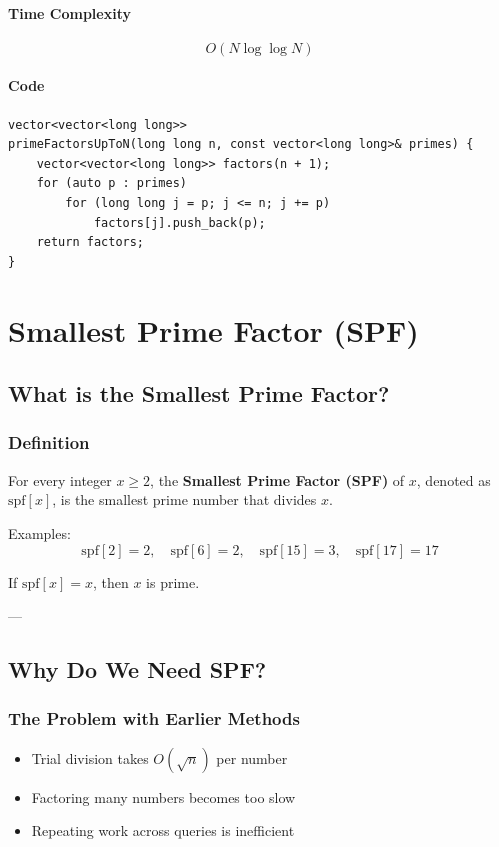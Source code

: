 \documentclass[11pt]{article}
\begin{document}
\paragraph{Time Complexity}
\[
O(N \log \log N)
\]

\paragraph{Code}
\begin{lstlisting}
vector<vector<long long>>
primeFactorsUpToN(long long n, const vector<long long>& primes) {
    vector<vector<long long>> factors(n + 1);
    for (auto p : primes)
        for (long long j = p; j <= n; j += p)
            factors[j].push_back(p);
    return factors;
}
\end{lstlisting}

\section{Smallest Prime Factor (SPF)}

\subsection{What is the Smallest Prime Factor?}

\subsubsection{Definition}
For every integer $x \ge 2$, the \textbf{Smallest Prime Factor (SPF)} of $x$,
denoted as $\text{spf}[x]$, is the smallest prime number that divides $x$.

Examples:
\[
\text{spf}[2] = 2,\quad
\text{spf}[6] = 2,\quad
\text{spf}[15] = 3,\quad
\text{spf}[17] = 17
\]

If $\text{spf}[x] = x$, then $x$ is prime.

---

\subsection{Why Do We Need SPF?}

\subsubsection{The Problem with Earlier Methods}
\begin{itemize}
    \item Trial division takes $O(\sqrt{n})$ per number
    \item Factoring many numbers becomes too slow
    \item Repeating work across queries is inefficient
\end{itemize}
\end{document}
